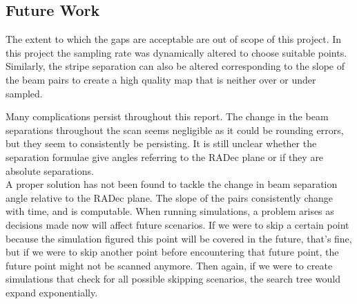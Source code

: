 \documentclass{article}%
\begin{document}
\subsection{Future Work}
The extent to which the gaps are acceptable are out of scope of this project. In this project the sampling rate was dynamically altered to choose suitable points. Similarly, the stripe separation can also be altered corresponding to the slope of the beam pairs to create a high quality map that is neither over or under sampled.

Many complications persist throughout this report. The change in the beam separations throughout the scan seems negligible as it could be rounding errors, but they seem
to consistently be persisting. It is still unclear whether the separation formulae give angles referring to the RADec plane or if they are absolute separations.\\ 

A proper solution has not been found to tackle the change in beam separation angle relative to the RADec plane. The slope of the pairs consistently change with time, and is computable. When running simulations, a problem arises as decisions made now will affect future scenarios. If we were to skip a certain point because the simulation figured this point will be covered in the future, that's fine, but if we were to skip another point before encountering that future point, the future point might not be scanned anymore. Then again, if we were to create simulations that check for all possible skipping scenarios, the search tree would expand exponentially.
\newpage
\end{document}

